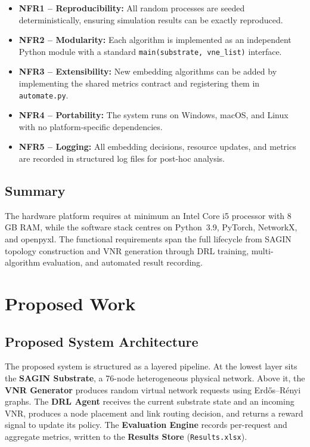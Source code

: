\documentclass[12pt,a4paper]{report}
\begin{document}
\begin{itemize}[leftmargin=*]
  \item \textbf{NFR1 -- Reproducibility:} All random processes are seeded deterministically,
        ensuring simulation results can be exactly reproduced.
  \item \textbf{NFR2 -- Modularity:} Each algorithm is implemented as an independent Python
        module with a standard \texttt{main(substrate, vne\_list)} interface.
  \item \textbf{NFR3 -- Extensibility:} New embedding algorithms can be added by implementing
        the shared metrics contract and registering them in \texttt{automate.py}.
  \item \textbf{NFR4 -- Portability:} The system runs on Windows, macOS, and Linux with no
        platform-specific dependencies.
  \item \textbf{NFR5 -- Logging:} All embedding decisions, resource updates, and metrics are
        recorded in structured log files for post-hoc analysis.
\end{itemize}

\section{Summary}

The hardware platform requires at minimum an Intel Core i5 processor with 8\,GB RAM, while
the software stack centres on Python~3.9, PyTorch, NetworkX, and openpyxl. The functional
requirements span the full lifecycle from SAGIN topology construction and VNR generation
through DRL training, multi-algorithm evaluation, and automated result recording.

\chapter{Proposed Work}

\section{Proposed System Architecture}

The proposed system is structured as a layered pipeline. At the lowest layer sits the
\textbf{SAGIN Substrate}, a 76-node heterogeneous physical network. Above it, the
\textbf{VNR Generator} produces random virtual network requests using Erdős--Rényi graphs.
The \textbf{DRL Agent} receives the current substrate state and an incoming VNR, produces a
node placement and link routing decision, and returns a reward signal to update its policy.
The \textbf{Evaluation Engine} records per-request and aggregate metrics, written to the
\textbf{Results Store} (\texttt{Results.xlsx}).
\end{document}
